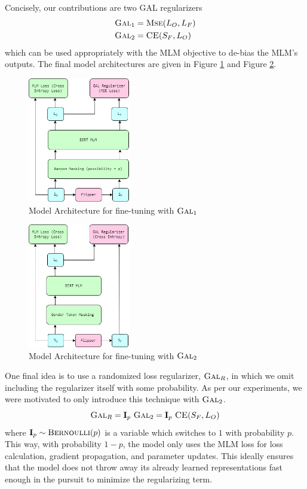 \documentclass[10pt,twocolumn,letterpaper]{article}
\begin{document}
Concisely, our contributions are two GAL regularizers
\begin{align}
    \textsc{Gal}_{1} &= \textsc{Mse}(L_{O}, L_{F}) \\
    \textsc{Gal}_{2} &= \textsc{CE}(S_{F}, L_{O})
\end{align}
which can be used appropriately with the MLM objective to de-bias the MLM's outputs.
The final model architectures are given in Figure \ref{fig:model1} and Figure \ref{fig:model2}.
\begin{figure}
    \centering
    \includegraphics[width=0.4\textwidth]{Assets/model1.png}
    \caption{Model Architecture for fine-tuning with $\textsc{Gal}_{1}$}
    \label{fig:model1}
\end{figure}
\begin{figure}
    \centering
    \includegraphics[width=0.4\textwidth]{Assets/model2.png}
    \caption{Model Architecture for fine-tuning with $\textsc{Gal}_{2}$}
    \label{fig:model2}
\end{figure}

One final idea is to use a randomized loss regularizer, $\textsc{Gal}_{R}$, in which we omit including the regularizer itself with some probability.
As per our experiments, we were motivated to only introduce this technique with $\textsc{Gal}_{2}$.
\begin{equation}
    \textsc{Gal}_{R} = \textbf{I}_{p} \ \textsc{Gal}_{2} = \textbf{I}_{p} \ \textsc{CE}(S_{F}, L_{O})
\end{equation}
where $\textbf{I}_{p} \sim \textsc{Bernoulli}(p)$ is a variable which switches to $1$ with probability $p$.
This way, with probability $1-p$, the model only uses the MLM loss for loss calculation, gradient propagation, and parameter updates.
This ideally ensures that the model does not throw away its already learned representations fast enough in the pursuit to minimize the regularizing term.
\end{document}
